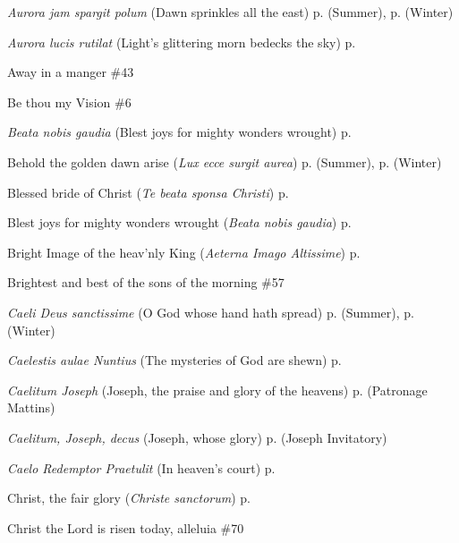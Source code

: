 \begin{hangparas}{1.25em}{1}
\textit{Aurora jam spargit polum} (Dawn sprinkles all the east) \dotfill p. \pageref{SaturdayMattinsSummer} (Summer), p. \pageref{SaturdayMattinsWinter} (Winter)
\par\noindent
\textit{Aurora lucis rutilat} (Light's glittering morn bedecks the sky) \dotfill p. \pageref{EasterMattins}
\par\noindent
Away in a manger \dotfill \#43
\par\noindent
Be thou my Vision \dotfill \#6
\par\noindent
\textit{Beata nobis gaudia} (Blest joys for mighty wonders wrought) \dotfill p. \pageref{WhitsundayMattins}
\par\noindent
Behold the golden dawn arise (\textit{Lux ecce surgit aurea}) \dotfill p. \pageref{ThursdayMattinsSummer} (Summer), p. \pageref{ThursdayMattinsWinter} (Winter)
\par\noindent
Blessed bride of Christ (\textit{Te beata sponsa Christi}) \dotfill p. \pageref{ScholasticaEvensong}
\par\noindent
Blest joys for mighty wonders wrought (\textit{Beata nobis gaudia}) \dotfill p. \pageref{WhitsundayMattins}
\par\noindent
Bright Image of the heav'nly King (\textit{Aeterna Imago Altissime}) \dotfill p. \pageref{ChristTheKingInvitatory}
\par\noindent
Brightest and best of the sons of the morning \dotfill \#57
\par\noindent
\textit{Caeli Deus sanctissime} (O God whose hand hath spread) \dotfill p. \pageref{WednesdayEvensongSummer} (Summer), p. \pageref{WednesdayEvensongWinter} (Winter)
\par\noindent
\textit{Caelestis aulae Nuntius} (The mysteries of God are shewn) \dotfill p. \pageref{HolyRosaryEvensong}
\par\noindent
\textit{Caelitum Joseph} (Joseph, the praise and glory of the heavens) \dotfill p. \pageref{PatronageMattins} (Patronage Mattins)
\par\noindent
\textit{Caelitum, Joseph, decus} (Joseph, whose glory) \dotfill p. \pageref{JosephInvitatory} (Joseph Invitatory)
\par\noindent
\textit{Caelo Redemptor Praetulit} (In heaven's court) \dotfill p. \pageref{MotherhoodInvitatory}
\par\noindent
Christ, the fair glory (\textit{Christe sanctorum}) \dotfill p. \pageref{MichaelMattins}
\par\noindent
Christ the Lord is risen today, alleluia \dotfill \#70

\end{hangparas}
